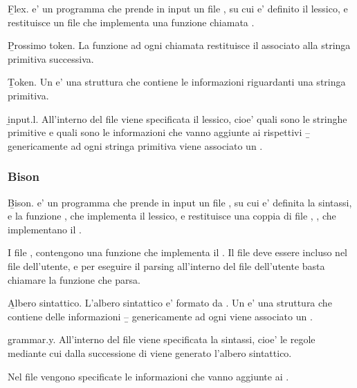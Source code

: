 \b{Flex}.  e' un programma che prende in input un file , su cui e' definito il lessico, e restituisce un file  che implementa una funzione chiamata .

\skipline

\b{Prossimo token}. La funzione  ad ogni chiamata restituisce il  associato alla stringa primitiva successiva.

\skipline

\b{Token}. Un  e' una struttura che contiene le informazioni riguardanti una stringa primitiva.

\skipline

\b{input.l}. All'interno del file  viene specificata il lessico, cioe' quali sono le stringhe primitive e quali sono le informazioni che vanno aggiunte ai rispettivi  \b{--} genericamente ad ogni stringa primitiva viene associato un .

\subsubsection{Bison}

\b{Bison}.  e' un programma che prende in input un file , su cui e' definita la sintassi, e la funzione , che implementa il lessico, e restituisce una coppia di file , , che implementano il .

\skipline

I file ,  contengono una funzione che implementa il . Il file  deve essere incluso nel file  dell'utente, e per eseguire il parsing all'interno del file dell'utente basta chiamare la funzione che parsa.

\skipline

\b{Albero sintattico}. L'albero sintattico e' formato da . Un  e' una struttura che contiene delle informazioni \b{--} genericamente ad ogni  viene associato un .

\skipline

\b{grammar.y}. All'interno del file  viene specificata la sintassi, cioe' le regole mediante cui dalla successione di  viene generato l'albero sintattico.

\skipline

Nel file  vengono specificate le informazioni che vanno aggiunte ai .


